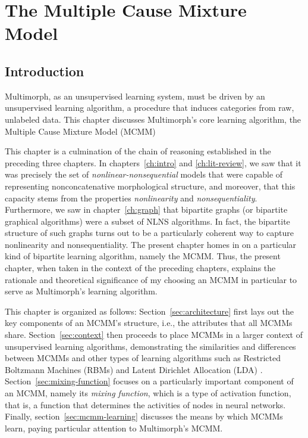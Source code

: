\chapter{The Multiple Cause Mixture Model}
\label{ch:MCMM}

\section{Introduction}
\label{sec:mcmm:intro}
Multimorph, as an unsupervised learning system, must be
driven by an unsupervised learning algorithm, a procedure that induces categories from raw, unlabeled data.
This chapter discusses Multimorph's core learning algorithm, the Multiple Cause Mixture Model (MCMM) \citep{saund:94} 

This chapter is a culmination of the chain of reasoning established in the preceding three chapters.
In chapters~\ref{ch:intro} and \ref{ch:lit-review}, we saw that it was precisely 
the set of \emph{nonlinear-nonsequential} models that were capable of representing 
nonconcatenative morphological structure, and moreover, that this capacity stems from the properties \emph{nonlinearity}
and \emph{nonsequentiality}. Furthermore, we saw in 
chapter~\ref{ch:graph} that bipartite graphs (or bipartite graphical algorithms) were a 
subset of NLNS algorithms. In fact, the bipartite structure of such graphs turns out to 
be a particularly coherent way to capture nonlinearity and nonsequentiality.
The present chapter homes in on a particular kind of bipartite learning algorithm, namely 
the MCMM. Thus, the present chapter, when taken in the context of the preceding chapters, 
explains the rationale and theoretical significance of my choosing an MCMM 
in particular to serve as Multimorph's learning algorithm.

This chapter is organized as follows: Section~\ref{sec:architecture} first lays out the key components 
of an MCMM's structure, i.e., the attributes that all MCMMs share. 
Section~\ref{sec:context} then proceeds to place MCMMs in a larger context of 
unsupervised learning algorithms, demonstrating 
the similarities and differences between MCMMs and other types of
 learning algorithms such as Restricted Boltzmann Machines (RBMs) \citep{smolensky:1986, hinton:2002}
 and Latent Dirichlet Allocation (LDA) \citep{blei-et-al:2003}. Section~\ref{sec:mixing-function} 
 focuses on a particularly important component of an MCMM, namely its 
 \emph{mixing function}, which is a type of activation function, that is, a 
 function that determines the activities of nodes in neural networks.  
Finally, section~\ref{sec:mcmm-learning} discusses the means by which 
MCMMs learn, paying particular attention to Multimorph's MCMM.

